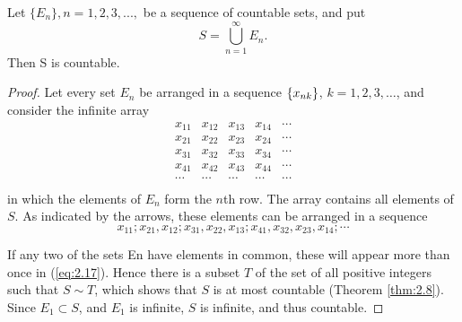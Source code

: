

\begin{thm}
    \label{thm:2.12}
    Let $\{E_n\}, n=1,2,3,...,$ be a sequence of countable sets, and put
    \begin{equation}
        \label{eq:2.15}
        S = \bigcup_{n=1}^{\infty} E_n.
    \end{equation}
    Then S is countable.
\end{thm}

\begin{proof}
    Let every set $E_n$ be arranged in a sequence $\protect\{x_{nk}\}$, 
    $k = 1,2,3,\dots$,
    and consider the infinite array
    \begin{equation}
        \label{eq:2.16}
        \begin{array}{ccccc}
            x_{11} & x_{12} & x_{13} & x_{14} & \cdots \\  
            x_{21} & x_{22} & x_{23} & x_{24} & \cdots \\  
            x_{31} & x_{32} & x_{33} & x_{34} & \cdots \\  
            x_{41} & x_{42} & x_{43} & x_{44} & \cdots \\  
            \cdots & \cdots & \cdots & \cdots & \cdots \\
        \end{array}
    \end{equation}
    in which the elements of $E_n$ form the $n$th row. 
    The array contains all elements of $S$.
    As indicated by the arrows, 
    these elements can be arranged in a sequence
    \begin{equation}
        \label{eq:2.17}
        x_{11};
        x_{21}, x_{12};
        x_{31}, x_{22}, x_{13};
        x_{41}, x_{32}, x_{23}, x_{14};
        \cdots
    \end{equation}
    
    If any two of the sets En have elements in common, 
    these will appear more than once in (\ref{eq:2.17}). 
    Hence there is a subset $T$ of the set of all positive integers 
    such that $S \sim T$, 
    which shows that $S$ is at most countable (Theorem \ref{thm:2.8}). 
    Since $E_1 \subset S$, and $E_1$ is infinite, 
    $S$ is infinite, and thus countable.
\end{proof}


